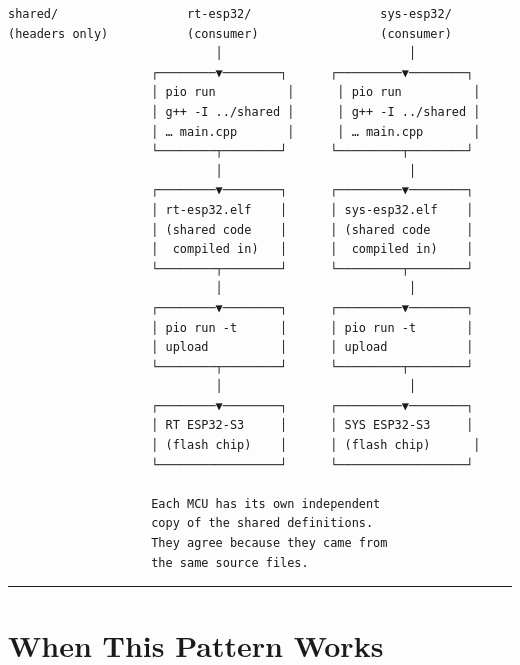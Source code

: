 \documentclass[12pt,a4paper,oneside]{report}
\begin{document}
\begin{verbatim}
shared/                  rt-esp32/                  sys-esp32/
(headers only)           (consumer)                 (consumer)
                             │                          │
                    ┌────────▼────────┐      ┌─────────▼────────┐
                    │ pio run          │      │ pio run          │
                    │ g++ -I ../shared │      │ g++ -I ../shared │
                    │ … main.cpp       │      │ … main.cpp       │
                    └────────┬────────┘      └─────────┬────────┘
                             │                          │
                    ┌────────▼────────┐      ┌─────────▼────────┐
                    │ rt-esp32.elf    │      │ sys-esp32.elf    │
                    │ (shared code    │      │ (shared code     │
                    │  compiled in)   │      │  compiled in)    │
                    └────────┬────────┘      └─────────┬────────┘
                             │                          │
                    ┌────────▼────────┐      ┌─────────▼────────┐
                    │ pio run -t      │      │ pio run -t       │
                    │ upload          │      │ upload           │
                    └────────┬────────┘      └─────────┬────────┘
                             │                          │
                    ┌────────▼────────┐      ┌─────────▼────────┐
                    │ RT ESP32-S3     │      │ SYS ESP32-S3     │
                    │ (flash chip)    │      │ (flash chip)      │
                    └─────────────────┘      └──────────────────┘

                    Each MCU has its own independent
                    copy of the shared definitions.
                    They agree because they came from
                    the same source files.
\end{verbatim}

\begin{center}\rule{0.5\linewidth}{0.5pt}\end{center}

\section{When This Pattern Works}\label{when-this-pattern-works}
\end{document}
